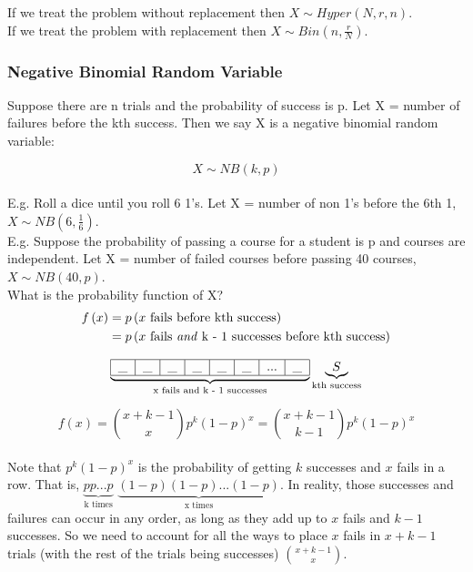 \documentclass[12pt, letterpaper]{article}
\begin{document}
If we treat the problem without replacement then \(X \sim Hyper(N, r, n)\).\\

If we treat the problem with replacement then \(X \sim Bin(n, \frac{r}{N})\).\\

\subsubsection{Negative Binomial Random Variable}
Suppose there are n trials and the probability of success is p. Let X = number of failures before the kth success. Then we say X is a negative binomial random variable:

\begin{equation}
X \sim NB(k, p)
\end{equation}\\

E.g. Roll a dice until you roll 6 1's. Let X = number of non 1's before the 6th 1, \(X \sim NB(6, \frac{1}{6})\).\\

E.g. Suppose the probability of passing a course for a student is p and courses are independent. Let X = number of failed courses before passing 40 courses, \(X \sim NB(40, p)\).\\

What is the probability function of X?
\begin{align*}
f\left(x\right) &= p\left(\text{$x$ fails before kth success}\right)\\
&= p\left(\text{$x$ fails \text{\emph{and}} k - 1 successes before kth success}\right)
\end{align*}

\[
\underbrace{
\begin{tabular}{|c|c|c|c|c|c|c|c|c|}
	\hline \_ & \_ & \_ & \_ & \_ & \_ & ... & \_ \\ \hline
\end{tabular}
}_\text{x fails and k - 1 successes}
\underbrace{S}_\text{kth success}
\]

\begin{equation}
f\left(x\right) = {{x + k - 1} \choose {x}}p^k (1 - p)^x = {{x + k - 1} \choose {k - 1}}p^k (1 - p)^x
\end{equation}\\

Note that \(p^k (1 - p)^{x}\) is the probability of getting \(k\) successes and \(x\) fails in a row. That is, \(\underbrace{p p ... p}_\text{k times}\) \(\underbrace{(1 - p) (1 - p) ... (1 - p)}_\text{x times}\). In reality, those successes and failures can occur in any order, as long as they add up to \(x\) fails and \(k - 1\) successes. So we need to account for all the ways to place \(x\) fails in \(x + k - 1\) trials (with the rest of the trials being successes) \({{x + k - 1} \choose {x}}\).\\
\end{document}
